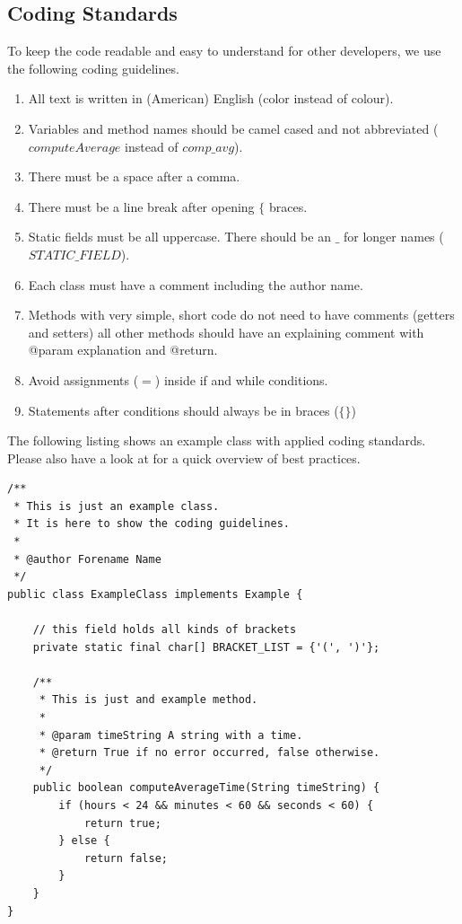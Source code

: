 \documentclass[a4paper,twoside]{article}      %
\begin{document}
\subsection{Coding Standards}
To keep the code readable and easy to understand for other developers, we use the following coding guidelines.
\begin{enumerate}
\item All text is written in (American) English (color instead of colour).
\item Variables and method names should be camel cased and not abbreviated ($computeAverage$ instead of $comp\_avg$).
\item There must be a space after a comma.
\item There must be a line break after opening $\{$ braces.
\item Static fields must be all uppercase. There should be an $\_$ for longer names ($STATIC\_FIELD$).
\item Each class must have a comment including the author name.
\item Methods with very simple, short code do not need to have comments (getters and setters) all other methods should have an explaining comment with @param explanation and @return.
\item Avoid assignments ($=$) inside if and while conditions.
\item Statements after conditions should always be in braces ($\{\}$)
\end{enumerate}

The following listing shows an example class with applied coding standards. Please also have a look at \cite{codingStandards} for a quick overview of best practices.

\begin{codelisting}
\begin{lstlisting}[frame=tb]
/**
 * This is just an example class.
 * It is here to show the coding guidelines.
 * 
 * @author Forename Name
 */
public class ExampleClass implements Example {

	// this field holds all kinds of brackets
	private static final char[] BRACKET_LIST = {'(', ')'};

	/**
	 * This is just and example method.
	 * 
	 * @param timeString A string with a time.
	 * @return True if no error occurred, false otherwise.
	 */
	public boolean computeAverageTime(String timeString) {
		if (hours < 24 && minutes < 60 && seconds < 60) {
			return true;
		} else {
			return false;
		}
	}
}
\end{lstlisting}
\end{codelisting}
\end{document}
